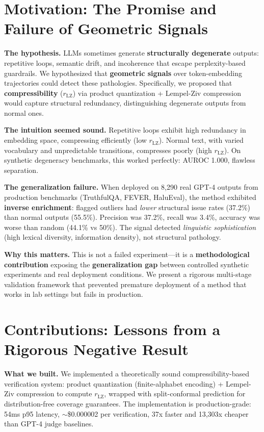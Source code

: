 \documentclass[11pt]{article}
\begin{document}
\section{Motivation: The Promise and Failure of Geometric Signals}
\label{sec:problem}

\textbf{The hypothesis.} LLMs sometimes generate \textbf{structurally degenerate} outputs: repetitive loops, semantic drift, and incoherence that escape perplexity-based guardrails. We hypothesized that \textbf{geometric signals} over token-embedding trajectories could detect these pathologies. Specifically, we proposed that \textbf{compressibility} ($r_{\text{LZ}}$) via product quantization + Lempel-Ziv compression would capture structural redundancy, distinguishing degenerate outputs from normal ones.

\textbf{The intuition seemed sound.} Repetitive loops exhibit high redundancy in embedding space, compressing efficiently (low $r_{\text{LZ}}$). Normal text, with varied vocabulary and unpredictable transitions, compresses poorly (high $r_{\text{LZ}}$). On synthetic degeneracy benchmarks, this worked perfectly: AUROC 1.000, flawless separation.

\textbf{The generalization failure.} When deployed on 8,290 real GPT-4 outputs from production benchmarks (TruthfulQA, FEVER, HaluEval), the method exhibited \textbf{inverse enrichment}: flagged outliers had \textit{lower} structural issue rates (37.2\%) than normal outputs (55.5\%). Precision was 37.2\%, recall was 3.4\%, accuracy was worse than random (44.1\% vs 50\%). The signal detected \textit{linguistic sophistication} (high lexical diversity, information density), not structural pathology.

\textbf{Why this matters.} This is not a failed experiment---it is a \textbf{methodological contribution} exposing the \textbf{generalization gap} between controlled synthetic experiments and real deployment conditions. We present a rigorous multi-stage validation framework that prevented premature deployment of a method that works in lab settings but fails in production.

\section{Contributions: Lessons from a Rigorous Negative Result}
\label{sec:contributions}

\textbf{What we built.} We implemented a theoretically sound compressibility-based verification system: product quantization (finite-alphabet encoding) + Lempel-Ziv compression to compute $r_{\text{LZ}}$, wrapped with split-conformal prediction for distribution-free coverage guarantees. The implementation is production-grade: 54ms p95 latency, $\sim$\$0.000002 per verification, 37x faster and 13,303x cheaper than GPT-4 judge baselines.
\end{document}
